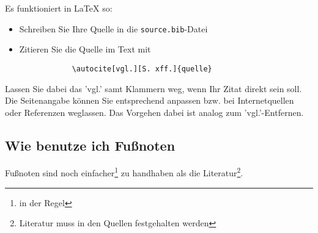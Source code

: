     Es funktioniert in \LaTeX{} so:
    \begin{itemize}
        \item Schreiben Sie Ihre Quelle in die \texttt{source.bib}-Datei
        \item Zitieren Sie die Quelle im Text mit \begin{verbatim}
            \autocite[vgl.][S. xff.]{quelle}
        \end{verbatim}
       
    \end{itemize} 
    Lassen Sie dabei das 'vgl.' samt Klammern weg, wenn Ihr Zitat direkt sein soll.
    Die Seitenangabe können Sie entsprechend anpassen bzw. bei Internetquellen oder Referenzen weglassen. Das Vorgehen dabei ist analog zum 'vgl.'-Entfernen.

    \subsection{Wie benutze ich Fußnoten}
    Fußnoten sind noch einfacher\footnote{in der Regel} zu handhaben als die Literatur\footnote{Literatur muss in den Quellen festgehalten werden}.
